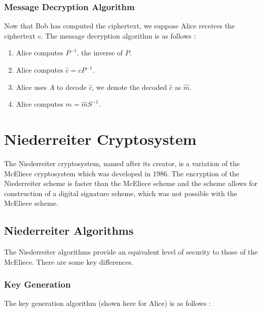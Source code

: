 \subsubsection{Message Decryption Algorithm}

Now that Bob has computed the ciphertext, we suppose Alice receives the ciphertext $c$. The message decryption algorithm is as follows \cite{1978DSNPR..44..114M}:

\begin{enumerate}
    \item Alice computes $P^{-1}$, the inverse of $P$.
    
    \item Alice computes $\hat c = cP^{-1}$.
    
    \item Alice uses $A$ to decode $\hat c$, we denote the decoded $\hat c$ as $\hat m$.
    
    \item Alice computes $m = \hat m S^{-1}$.
\end{enumerate}

\section{Niederreiter Cryptosystem}

The Niederreiter cryptosystem, named after its creator, is a variation of the McEliece cryptosystem which was developed in 1986. The encryption of the Niederreiter scheme is faster than the McEliece scheme and the scheme allows for construction of a digital signature scheme, which was not possible with the McEliece scheme.

\subsection{Niederreiter Algorithms}

The Niederreiter algorithms provide an equivalent level of security to those of the McEliece. There are some key differences.

\subsubsection{Key Generation}

The key generation algorithm (shown here for Alice) is as follows \cite{80003180051}:

